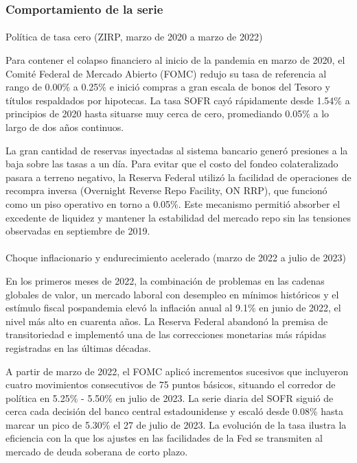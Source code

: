 \documentclass[
  10pt,
  letterpaper,
  DIV=11,
  numbers=noendperiod]{scrartcl}
\makeatletter
\let\oldparagraph\paragraph
\renewcommand{\paragraph}{
    \@ifstar
      \xxxParagraphStar
      \xxxParagraphNoStar
  }
\newcommand{\xxxParagraphStar}[1]{\oldparagraph*{#1}\mbox{}}
\newcommand{\xxxParagraphNoStar}[1]{\oldparagraph{#1}\mbox{}}
\makeatother
\begin{document}
\subsubsection{Comportamiento de la
serie}\label{comportamiento-de-la-serie-1}

\paragraph{Política de tasa cero (ZIRP, marzo de 2020 a marzo de
2022)}\label{poluxedtica-de-tasa-cero-zirp-marzo-de-2020-a-marzo-de-2022}

Para contener el colapso financiero al inicio de la pandemia en marzo de
2020, el Comité Federal de Mercado Abierto (FOMC) redujo su tasa de
referencia al rango de 0.00\% a 0.25\% e inició compras a gran escala de
bonos del Tesoro y títulos respaldados por hipotecas. La tasa SOFR cayó
rápidamente desde 1.54\% a principios de 2020 hasta situarse muy cerca
de cero, promediando 0.05\% a lo largo de dos años continuos.

La gran cantidad de reservas inyectadas al sistema bancario generó
presiones a la baja sobre las tasas a un día. Para evitar que el costo
del fondeo colateralizado pasara a terreno negativo, la Reserva Federal
utilizó la facilidad de operaciones de recompra inversa (Overnight
Reverse Repo Facility, ON RRP), que funcionó como un piso operativo en
torno a 0.05\%. Este mecanismo permitió absorber el excedente de
liquidez y mantener la estabilidad del mercado repo sin las tensiones
observadas en septiembre de 2019.

\paragraph{Choque inflacionario y endurecimiento acelerado (marzo de
2022 a julio de
2023)}\label{choque-inflacionario-y-endurecimiento-acelerado-marzo-de-2022-a-julio-de-2023}

En los primeros meses de 2022, la combinación de problemas en las
cadenas globales de valor, un mercado laboral con desempleo en mínimos
históricos y el estímulo fiscal pospandemia elevó la inflación anual al
9.1\% en junio de 2022, el nivel más alto en cuarenta años. La Reserva
Federal abandonó la premisa de transitoriedad e implementó una de las
correcciones monetarias más rápidas registradas en las últimas décadas.

A partir de marzo de 2022, el FOMC aplicó incrementos sucesivos que
incluyeron cuatro movimientos consecutivos de 75 puntos básicos,
situando el corredor de política en 5.25\% - 5.50\% en julio de 2023. La
serie diaria del SOFR siguió de cerca cada decisión del banco central
estadounidense y escaló desde 0.08\% hasta marcar un pico de 5.30\% el
27 de julio de 2023. La evolución de la tasa ilustra la eficiencia con
la que los ajustes en las facilidades de la Fed se transmiten al mercado
de deuda soberana de corto plazo.
\end{document}

